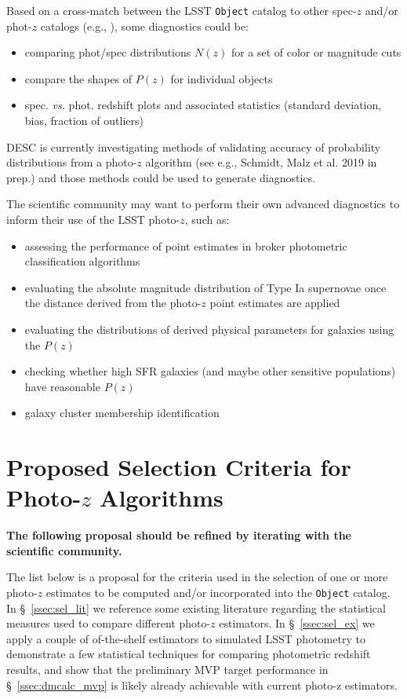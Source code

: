 \documentclass[DM,lsstdraft,toc]{lsstdoc}
\begin{document}
Based on a cross-match between the LSST {\tt Object} catalog to other spec-$z$ and/or phot-$z$ catalogs (e.g., \citealt{2019MNRAS.488.4565Z}), some diagnostics could be:
\begin{itemize}%
\item comparing phot/spec distributions $N(z)$ for a set of color or magnitude cuts
\item compare the shapes of $P(z)$ for individual objects
\item spec. {\it vs.} phot. redshift plots and associated statistics (standard deviation, bias, fraction of outliers)
\end{itemize}

DESC is currently investigating methods of validating accuracy of probability distributions from a photo-$z$ algorithm (see e.g., Schmidt, Malz et al. 2019 in prep.) and those methods could be used to generate diagnostics.

The scientific community may want to perform their own advanced diagnostics to inform their use of the LSST photo-$z$, such as:
\begin{itemize}%
\item assessing the performance of point estimates in broker photometric classification algorithms
\item evaluating the absolute magnitude distribution of Type Ia supernovae once the distance derived from the photo-$z$ point estimates are applied
\item evaluating the distributions of derived physical parameters for galaxies using the $P(z)$
\item checking whether high SFR galaxies (and maybe other sensitive populations) have reasonable $P(z)$
\item galaxy cluster membership identification
\end{itemize}



\clearpage
\section{Proposed Selection Criteria for Photo-$z$ Algorithms} \label{sec:sel}

{\bf The following proposal should be refined by iterating with the scientific community.}

The list below is a proposal for the criteria used in the selection of one or more photo-$z$ estimates to be computed and/or incorporated into the {\tt Object} catalog.
In \S~\ref{ssec:sel_lit} we reference some existing literature regarding the statistical measures used to compare different photo-$z$ estimators.
In \S~\ref{ssec:sel_ex} we apply a couple of of-the-shelf estimators to simulated LSST photometry to demonstrate a few statistical techniques for comparing photometric redshift results, and show that the preliminary MVP target performance in \S~\ref{ssec:dmcalc_mvp} is likely already achievable with current photo-z estimators.
\end{document}
